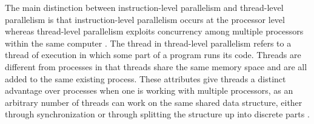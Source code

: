 The main distinction between instruction-level parallelism and thread-level parallelism is that instruction-level parallelism occurs at the processor level whereas thread-level parallelism exploits concurrency among multiple processors within the same computer \cite{hpc_openstax}.  The thread in thread-level parallelism refers to a thread of execution in which some part of a program runs its code. Threads are different from processes in that threads share the same memory space and are all added to the same existing process. These attributes give threads a distinct advantage over processes when one is working with multiple processors, as an arbitrary number of threads can work on the same shared data structure, either through synchronization or through splitting the structure up into discrete parts \cite{hpc_openstax}. 


